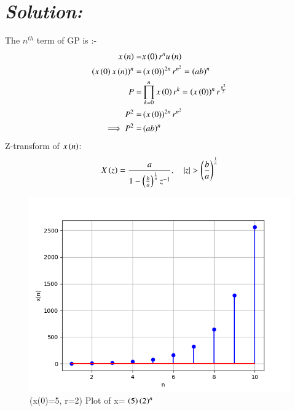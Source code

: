 \documentclass[journal,12pt,twocolumn]{IEEEtran}
\theoremstyle{remark}
\begin{document}
\section*{\textit{\textbf{Solution:}}}

The  $n^{th}$ term of GP is :-
\begin{align}
x\left(n\right) = & x\left(0\right)r^{n} u\left(n\right)\\
\left(x\left(0\right)x\left(n\right)\right)^n = & \left(x\left(0\right)\right)^{2n} r^{n^2}= \left(ab\right)^n\\
P =& \prod_{k=0}^{n} x\left(0\right)r^{k}= \left(x\left(0\right)\right)^n r^{\frac{n^2}{2}}\\
P^2 =& \left(x\left(0\right)\right)^{2n} r^{n^2}\\
\implies  P^2 =& \left(ab\right)^n \\
\end {align}
Z-transform of $x\left(n\right)$:
\begin{align}
X\brak{z}= \frac{a}{1-\left(\frac{b}{a}\right)^{\frac{1}{n}}{z^{-1}}} , \quad{|z|>\left(\frac{b}{a}\right)^{\frac{1}{n}}}
\end{align}
\begin{figure}[ht]
    \centering
    \includegraphics[width=\columnwidth]{figs/fig.png}
    \caption{(x(0)=5, r=2) Plot of x= $\left(5\right)\left(2\right)^n$}
    \label{fig: 11.9.3.22}
\end{figure}
\end{document}
